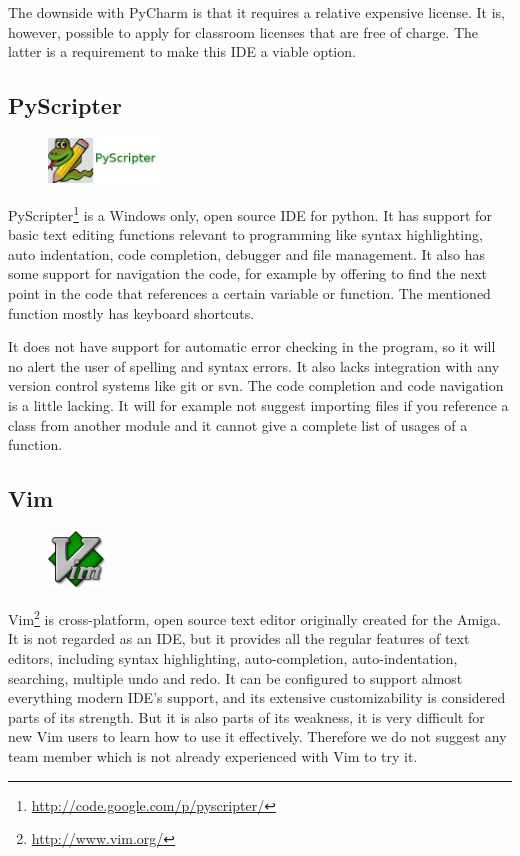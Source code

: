 The downside with PyCharm is that it requires a relative expensive license. It
is, however, possible to apply for classroom licenses that are free of charge.
The latter is a requirement to make this IDE a viable option.

\subsection{PyScripter}
\begin{figure}
	\vspace{-20pt}
	\includegraphics[width=3cm]{./planning/img/pyscripter_logo}
	\vspace{-20pt}
\end{figure}
PyScripter\footnote{\url{http://code.google.com/p/pyscripter/}}
is a Windows only, open source IDE for python. It has support for
basic text editing functions relevant to programming like syntax highlighting,
auto indentation, code completion, debugger and file management. It also has
some support for navigation the code, for example by offering to find the next
point in the code that references a certain variable or function. The mentioned
function mostly has keyboard shortcuts.

It does not have support for automatic error checking in the program, so it
will no alert the user of spelling and syntax errors. It also lacks integration
with any version control systems like git or svn. The code completion and
code navigation is a little lacking. It will for example not suggest importing
files if you reference a class from another module and it cannot give a
complete list of usages of a function.

\subsection{Vim}
\begin{figure}
	\vspace{-20pt}
	\includegraphics[width=1.5cm]{./planning/img/vim_logo}
	\vspace{-20pt}
\end{figure}
Vim\footnote{\url{http://www.vim.org/}} is cross-platform, open source text
editor originally created for the Amiga. It is not regarded as an IDE, but it
provides all the regular features of text editors, including syntax
highlighting, auto-completion, auto-indentation, searching, multiple undo and
redo. It can be configured to support almost everything modern IDE’s support,
and its extensive customizability is considered parts of its strength. But it
is also parts of its weakness, it is very difficult for new Vim users to learn
how to use it effectively. Therefore we do not suggest any team member which is
not already experienced with Vim to try it.


